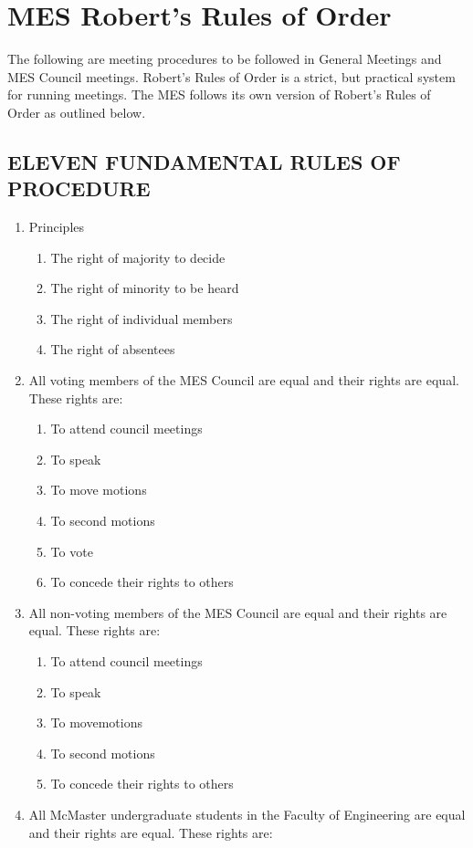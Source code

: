 \section{MES Robert's Rules of Order}
\label{mes-roberts-rules-of-order}
The following are meeting procedures to be followed in General Meetings
and MES Council meetings. Robert's Rules of Order is a strict, but
practical system for running meetings. The MES follows its own version
of Robert's Rules of Order as outlined below.

\subsection{ELEVEN FUNDAMENTAL RULES OF PROCEDURE}
\label{eleven-fundamental-rules-of-procedure}

\begin{enumerate}
 \item
  Principles

  \begin{enumerate}
   \item
    The right of majority to decide
   \item
    The right of minority to be heard
   \item
    The right of individual members
   \item
    The right of absentees
  \end{enumerate}
 \item
  All voting members of the MES Council are equal and their rights are
  equal. These rights are:

  \begin{enumerate}
   \item
    To attend council meetings
   \item
    To speak
   \item
    To move motions
   \item
    To second motions
   \item
    To vote
   \item
    To concede their rights to others
  \end{enumerate}
 \item
  All non-voting members of the MES Council are equal and their rights
  are equal. These rights are:

  \begin{enumerate}
   \item
    To attend council meetings
   \item
    To speak
   \item
    To movemotions %
   \item
    To second motions
   \item
    To concede their rights to others
  \end{enumerate}
 \item
  All McMaster undergraduate students in the Faculty of Engineering are
  equal and their rights are equal. These rights are:


\end{enumerate}
